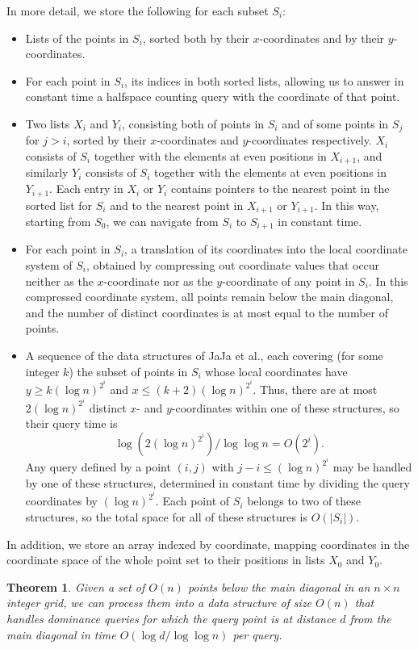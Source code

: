 \documentclass[11pt]{article}
\newtheorem{theorem}{Theorem}
\begin{document}
In more detail, we store the following for each subset $S_i$:
\begin{itemize}
\item Lists of the points in $S_i$, sorted both by their $x$-coordinates and by their $y$-coordinates.
\item For each point in $S_i$, its indices in both sorted lists, allowing us to answer in constant time a halfspace counting query with the coordinate of that point.
\item Two lists $X_i$ and $Y_i$, consisting both of points in $S_i$ and of some points in $S_{j}$ for $j>i$, sorted by their $x$-coordinates and $y$-coordinates respectively. $X_i$ consists of $S_i$ together with the elements at even positions in $X_{i+1}$, and similarly $Y_i$ consists of $S_i$ together with the elements at even positions in $Y_{i+1}$. Each entry in $X_i$ or $Y_i$ contains pointers to the nearest point in the sorted list for $S_i$ and to the nearest point in $X_{i+1}$ or $Y_{i+1}$. In this way, starting from $S_0$, we can navigate from $S_i$ to $S_{i+1}$ in constant time.
\item For each point in $S_i$, a translation of its coordinates into the local coordinate system of $S_i$, obtained by compressing out coordinate values that occur neither as the $x$-coordinate nor as the $y$-coordinate of any point in $S_i$. In this compressed coordinate system, all points remain below the main diagonal, and the number of distinct coordinates is at most equal to the number of points.
\item A sequence of the data structures of JaJa et al., each covering (for some integer $k$) the subset of points in $S_i$ whose local coordinates have $y\ge k(\log n)^{2^i}$ and $x\le(k+2)(\log n)^{2^i}$. Thus, there are at most $2(\log n)^{2^i}$ distinct $x$- and $y$-coordinates within one of these structures, so their query time is
$$
\log\left( 2(\log n)^{2^i} \right) / \log\log n = O(2^i).
$$
Any query defined by a point $(i,j)$ with $j-i\le (\log n)^{2^i}$ may be handled by one of these structures, determined in constant time by dividing the query coordinates by $(\log n)^{2^i}$. Each point of $S_i$ belongs to two of these structures, so the total space for all of these structures is $O(|S_i|)$.
\end{itemize}
In addition, we store an array indexed by coordinate, mapping coordinates in the coordinate space of the whole point set to their positions in lists $X_0$ and $Y_0$.

\begin{theorem}
Given a set of $O(n)$ points below the main diagonal in an $n\times n$ integer grid, we can process them into a data structure of size $O(n)$ that handles dominance queries for which the query point is at distance $d$ from the main diagonal in time $O(\log d/\log\log n)$ per query.
\end{theorem}
\end{document}
